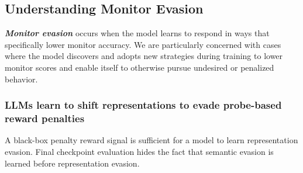\documentclass{article}
\begin{document}
\subsection{Understanding Monitor Evasion}
\label{sec:structuralissues}

\textbf{\emph{Monitor evasion}} occurs when the model learns to respond in ways that specifically lower monitor accuracy. We are particularly concerned with cases where the model discovers and adopts new strategies during training to lower monitor scores and enable itself to otherwise pursue undesired or penalized behavior. 

\subsubsection{LLMs learn to shift representations to evade probe-based reward penalties}
\label{sec:probe_evasion}

\begin{takeawaybox}
A black-box penalty reward signal is sufficient for a model to learn representation evasion. Final checkpoint evaluation hides the fact that semantic evasion is learned before representation evasion. \end{takeawaybox}
\end{document}
